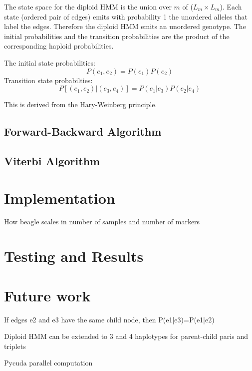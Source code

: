 \documentclass[a4paper,11pt,twoside,abstraction,titlepage]{article}
\begin{document}
The state space for the diploid HMM is the union over $m$ of ($L_m \times L_m$).  Each state (ordered pair of edges) emits with probability 1 the unordered alleles that label the edges.  Therefore the diploid HMM emits an unordered genotype.  The initial probabilities and the transition probabilities are the product of the corresponding haploid probabilities.

The initial state probabilities:
\begin{equation*}
P(e_1,e_2) = P(e_1)P(e_2)
\end{equation*}
Transition state probabilties:
\begin{equation*}
P[(e_1,e_2)|(e_3,e_4)] = P(e_1|e_3)P(e_2|e_4)
\end{equation*}

This is derived from the Hary-Weinberg principle.

\subsection{Forward-Backward Algorithm}

\subsection{Viterbi Algorithm}


\newpage
\section{Implementation}
How beagle scales in number of samples and number of markers

\newpage
\section{Testing and Results}


\newpage
\section{Future work}
If edges e2 and e3 have the same child node, then P(e1|e3)=P(e1|e2)

Diploid HMM can be extended to 3 and 4 haplotypes for parent-child paris and triplets

Pycuda parallel computation

\newpage
\end{document}
